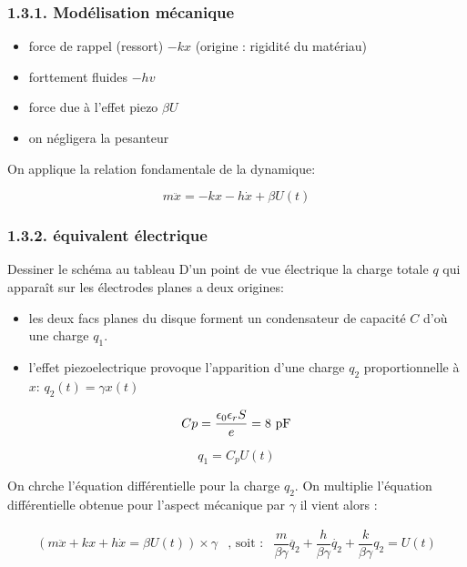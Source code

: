 \documentclass[french, a4paper, 10pt, twocolumn, landscape]{article}
\begin{document}
\subsubsection*{1.3.1. Modélisation mécanique}

\begin{itemize}
    \item force de rappel (ressort) $-kx$ (origine : rigidité du matériau)
    \item forttement fluides $-hv$
    \item force due à l'effet piezo $\beta U$
    \item on négligera la pesanteur
\end{itemize}

On applique la relation fondamentale de la dynamique: 

\begin{equation}
    m\ddot{x}=-kx-h\dot{x}+\beta U(t)
\end{equation}

\subsubsection*{1.3.2. équivalent électrique}

Dessiner le schéma au tableau
D'un point de vue électrique la charge totale $q$ qui apparaît sur les électrodes planes a deux origines: 
\begin{itemize}
    \item les deux facs planes du disque forment un condensateur de capacité $C$ d'où une charge $q_1$.
    \item l'effet piezoelectrique provoque l'apparition d'une charge $q_2$ proportionnelle à $x$: $q_2(t)=\gamma x(t)$
\end{itemize}
\begin{equation}
    Cp = \dfrac{\epsilon_0\epsilon_rS}{e} = 8~\rm pF    
\end{equation}

$$q_1=C_pU(t)$$

On chrche l'équation différentielle pour la charge $q_2$. On multiplie l'équation différentielle obtenue pour l'aspect mécanique par $\gamma$ il vient alors : 

\begin{equation}
    \begin{array}{lll}
    \left(m\ddot{x}+kx+h\dot{x}=\beta U(t)\right)\times \gamma&\text{, soit :}& \dfrac{m}{\beta\gamma}\ddot{q_2}+\dfrac{h}{\beta\gamma}\dot{q_2}+\dfrac{k}{\beta\gamma}q_2=U(t)
\end{array}
\end{equation}
\end{document}
